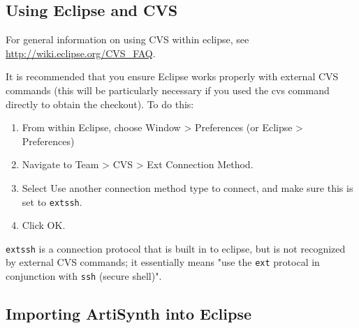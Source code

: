 \documentclass{article}
\begin{document}
\subsection{Using Eclipse and CVS}
\label{workingWithCVSSec}

For general information on using CVS within eclipse, see
\href{http://wiki.eclipse.org/CVS\_FAQ}{http://wiki.eclipse.org/CVS\_FAQ}.

It is recommended that you ensure Eclipse works properly with external
CVS commands (this will be particularly necessary if you used the
{\sf cvs} command directly to obtain the checkout). To do this:

\begin{enumerate}

\item From within Eclipse, choose {\sf Window > Preferences} (or {\sf Eclipse > Preferences})

\item Navigate to {\sf Team > CVS > Ext Connection Method}.

\item Select {\sf Use another connection method type to connect}, and make
  sure this is set to {\tt extssh}.

\item Click {\sf OK}.

\end{enumerate}

\begin{sideblock}
{\tt extssh} is a connection protocol that is built in to eclipse, but
is not recognized by external CVS commands; it essentially means "use the {\tt ext}
protocal in conjunction with {\tt ssh} (secure shell)".
\end{sideblock}

\subsection{Importing ArtiSynth into Eclipse}
\label{importingArtisynthSec}
\end{document}
